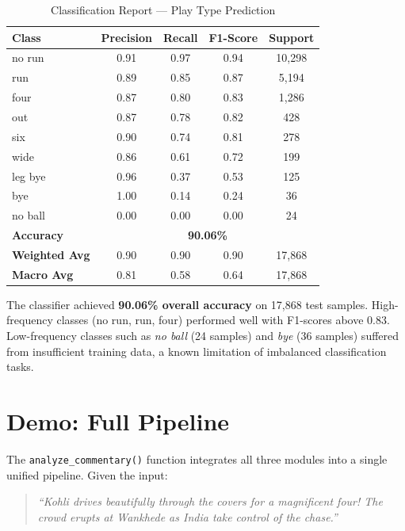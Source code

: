 \documentclass[12pt,a4paper]{article}
\begin{document}
\begin{table}[H]
\centering
\caption{Classification Report — Play Type Prediction}
\begin{tabular}{lcccc}
\toprule
\textbf{Class} & \textbf{Precision} & \textbf{Recall} & \textbf{F1-Score} & \textbf{Support} \\
\midrule
no run   & 0.91 & 0.97 & 0.94 & 10,298 \\
run      & 0.89 & 0.85 & 0.87 &  5,194 \\
four     & 0.87 & 0.80 & 0.83 &  1,286 \\
out      & 0.87 & 0.78 & 0.82 &    428 \\
six      & 0.90 & 0.74 & 0.81 &    278 \\
wide     & 0.86 & 0.61 & 0.72 &    199 \\
leg bye  & 0.96 & 0.37 & 0.53 &    125 \\
bye      & 1.00 & 0.14 & 0.24 &     36 \\
no ball  & 0.00 & 0.00 & 0.00 &     24 \\
\midrule
\textbf{Accuracy}      & \multicolumn{4}{c}{\textbf{90.06\%}} \\
\textbf{Weighted Avg}  & 0.90 & 0.90 & 0.90 & 17,868 \\
\textbf{Macro Avg}     & 0.81 & 0.58 & 0.64 & 17,868 \\
\bottomrule
\end{tabular}
\end{table}

The classifier achieved \textbf{90.06\% overall accuracy} on 17,868 test samples. High-frequency classes (no run, run, four) performed well with F1-scores above 0.83. Low-frequency classes such as \textit{no ball} (24 samples) and \textit{bye} (36 samples) suffered from insufficient training data, a known limitation of imbalanced classification tasks.

\section{Demo: Full Pipeline}

The \texttt{analyze\_commentary()} function integrates all three modules into a single unified pipeline. Given the input:

\begin{quote}
\textit{``Kohli drives beautifully through the covers for a magnificent four! The crowd erupts at Wankhede as India take control of the chase.''}
\end{quote}
\end{document}
